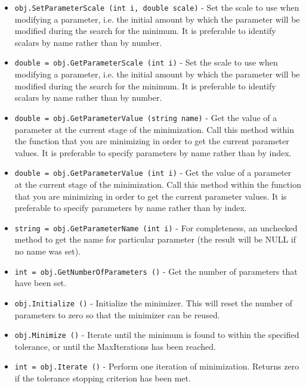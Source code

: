 \begin{itemize}
\item  \verb|obj.SetParameterScale (int i, double scale)| -  Set the scale to use when modifying a parameter, i.e. the
 initial amount by which the parameter will be modified
 during the search for the minimum.  It is preferable to
 identify scalars by name rather than by number.

\item  \verb|double = obj.GetParameterScale (int i)| -  Set the scale to use when modifying a parameter, i.e. the
 initial amount by which the parameter will be modified
 during the search for the minimum.  It is preferable to
 identify scalars by name rather than by number.

\item  \verb|double = obj.GetParameterValue (string name)| -  Get the value of a parameter at the current stage of the minimization.
 Call this method within the function that you are minimizing in order
 to get the current parameter values.  It is preferable to specify
 parameters by name rather than by index. 

\item  \verb|double = obj.GetParameterValue (int i)| -  Get the value of a parameter at the current stage of the minimization.
 Call this method within the function that you are minimizing in order
 to get the current parameter values.  It is preferable to specify
 parameters by name rather than by index. 

\item  \verb|string = obj.GetParameterName (int i)| -  For completeness, an unchecked method to get the name for particular
 parameter (the result will be NULL if no name was set).  

\item  \verb|int = obj.GetNumberOfParameters ()| -  Get the number of parameters that have been set.

\item  \verb|obj.Initialize ()| -  Initialize the minimizer.  This will reset the number of parameters to
 zero so that the minimizer can be reused.

\item  \verb|obj.Minimize ()| -  Iterate until the minimum is found to within the specified tolerance,
 or until the MaxIterations has been reached. 

\item  \verb|int = obj.Iterate ()| -  Perform one iteration of minimization.  Returns zero if the tolerance
 stopping criterion has been met.  


\end{itemize}
